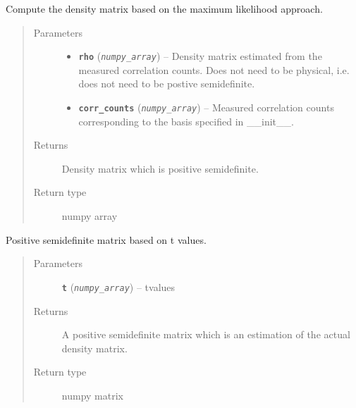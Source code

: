 \documentclass[letterpaper,10pt,english]{sphinxmanual}
\begin{document}
\begin{fulllineitems}
\begin{fulllineitems}
\label{modules:Tomography.DensityMatrix.rho_max_likelihood}
Compute the density matrix based on the maximum likelihood approach.
\begin{quote}\begin{description}
\item[{Parameters}] \leavevmode\begin{itemize}
\item {} 
\textbf{\texttt{rho}} (\emph{\texttt{numpy\_array}}) -- Density matrix estimated from the measured correlation counts. Does not need to be physical, i.e. does not need to be postive semidefinite.

\item {} 
\textbf{\texttt{corr\_counts}} (\emph{\texttt{numpy\_array}}) -- Measured correlation counts corresponding to the basis specified in \_\_init\_\_.

\end{itemize}

\item[{Returns}] \leavevmode
Density matrix which is positive semidefinite.

\item[{Return type}] \leavevmode
numpy array

\end{description}\end{quote}

\end{fulllineitems}


\begin{fulllineitems}
\label{modules:Tomography.DensityMatrix.rho_phys}
Positive semidefinite matrix based on t values.
\begin{quote}\begin{description}
\item[{Parameters}] \leavevmode
\textbf{\texttt{t}} (\emph{\texttt{numpy\_array}}) -- tvalues

\item[{Returns}] \leavevmode
A positive semidefinite matrix which is an estimation of the actual density matrix.

\item[{Return type}] \leavevmode
numpy matrix


\end{description}
\end{quote}
\end{fulllineitems}
\end{fulllineitems}
\end{document}
